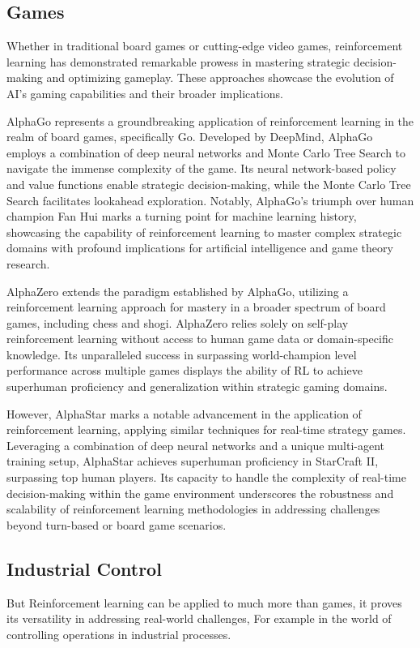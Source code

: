 \subsection*{Games}
Whether in traditional board games or cutting-edge video games, reinforcement learning has demonstrated remarkable prowess in mastering strategic decision-making and optimizing gameplay. These approaches showcase the evolution of AI's gaming capabilities and their broader implications.

AlphaGo\cite{silver2016mastering} represents a groundbreaking application of reinforcement learning in the realm of board games, specifically Go. Developed by DeepMind, AlphaGo employs a combination of deep neural networks and Monte Carlo Tree Search to navigate the immense complexity of the game. Its neural network-based policy and value functions enable strategic decision-making, while the Monte Carlo Tree Search facilitates lookahead exploration. Notably, AlphaGo's triumph over human champion Fan Hui marks a turning point for machine learning history, showcasing the capability of reinforcement learning to master complex strategic domains with profound implications for artificial intelligence and game theory research.

AlphaZero\cite{silver2017mastering} extends the paradigm established by AlphaGo, utilizing a reinforcement learning approach for mastery in a broader spectrum of board games, including chess and shogi. AlphaZero relies solely on self-play reinforcement learning without access to human game data or domain-specific knowledge. Its unparalleled success in surpassing world-champion level performance across multiple games displays the ability of RL to achieve superhuman proficiency and generalization within strategic gaming domains.

However, AlphaStar\cite{vinyals2019grandmaster} marks a notable advancement in the application of reinforcement learning, applying similar techniques for real-time strategy games. Leveraging a combination of deep neural networks and a unique multi-agent training setup, AlphaStar achieves superhuman proficiency in StarCraft II, surpassing top human players. Its capacity to handle the complexity of real-time decision-making within the game environment underscores the robustness and scalability of reinforcement learning methodologies in addressing challenges beyond turn-based or board game scenarios.

\subsection*{Industrial Control}
But Reinforcement learning can be applied to much more than games, it proves its versatility in addressing real-world challenges, For example in the world of controlling operations in industrial processes.

